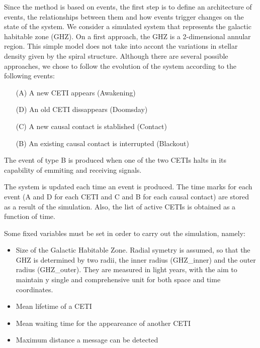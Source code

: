 \documentclass[useAMS,usenatbib]{mnras}
\begin{document}
Since the method is based on events, the first step is to define an
architecture of events, the relationships between them and how events
trigger changes on the state of the system.
%
We consider a simulated system that represents the galactic habitable
zone (GHZ).
%
On a first approach, the GHZ is a 2-dimensional annular region.
%
This simple model does not take into accont the variations in stellar
density given by the spiral structure.
%
Although there are several possible approaches, we chose to follow the
evolution of the system according to the following events:


\begin{enumerate}
   \item[(A)] A new CETI appears (Awakening)
   \item[(D)] An old CETI dissappears (Doomsday)
   \item[(C)] A new causal contact is stablished (Contact)
   \item[(B)] An existing causal contact is interrupted (Blackout)
\end{enumerate}


The event of type B is produced when one of the two CETIs halts in its
capability of emmiting and receiving signals.















The system is updated each time an event is produced.  The time marks
for each event (A and D for each CETI and C and B for each causal
contact) are stored as a result of the simulation.
%
Also, the list of active CETIs is obtained as a function of time.

Some fixed variables must be set in order to carry out the simulation,
namely:

\begin{itemize}
   \item Size of the Galactic Habitable Zone.  Radial symetry is
      assumed, so that the GHZ is determined by two radii, the inner
      radius (GHZ_inner) and the outer radius (GHZ_outer).  They are
      measured in light years, with the aim to maintain y single and
      comprehensive unit for both space and time coordinates.
   \item Mean lifetime of a CETI
   \item Mean waiting time for the appeareance of another CETI
   \item Maximum distance a message can be detected
\end{itemize}
\end{document}
